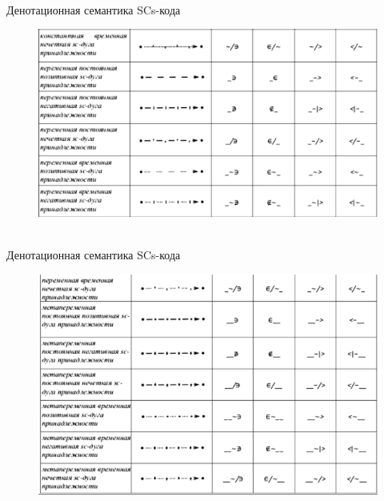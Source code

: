 \begin{frame}{\\Денотационная семантика SCs-кода}
	\topline
	\justifying
	\vspace*{\fill}\\
	\begin{SCn}
		\begin{figure}[H]
			\includegraphics[scale=0.5]{./figures/external_langs/table_scs_2.png}
		\end{figure}
	\end{SCn}
\end{frame}

\begin{frame}{\\Денотационная семантика SCs-кода}
	\topline
	\justifying
	\vspace*{\fill}\\
	\begin{SCn}
		\begin{figure}[H]
			\includegraphics[scale=0.5]{./figures/external_langs/table_scs_3.png}
		\end{figure}
	\end{SCn}
\end{frame}

